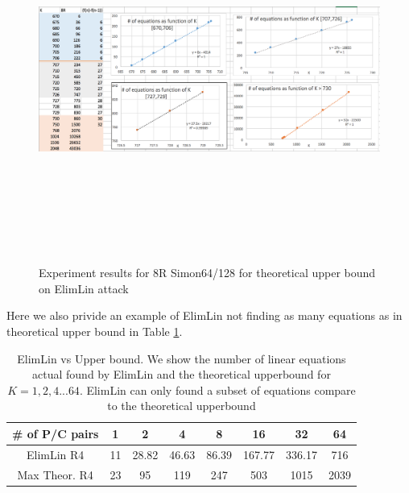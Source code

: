 \begin{figure}[h!]
	\centering
	\begin{minipage}[b][22cm][b]{12cm}
		\begin{turn}{90}
			\includegraphics*[width=220mm, height = 120mm]{./pics/ch6BigScreen.png}
			\end{turn}
			\end{minipage}
			\begin{turn}{90}
				\begin{minipage}[c][1cm][c]{22cm}
					\caption{Experiment results for 8R Simon64/128 for theoretical upper bound on ElimLin attack }
					\label{fig:FullResBig}
					\end{minipage} 
					\end{turn}
					\end{figure}

Here we also privide an example of ElimLin not finding as many equations as in theoretical upper bound in Table \ref{tab:ElimLinVsUpperBound}.
\begin{table}[h!]
	\centering
	\caption[ElimLin vs Upper bound]{ElimLin vs Upper bound. We show the number of linear equations actual found by ElimLin and the theoretical upperbound for $K = 1,2,4 ... 64$. ElimLin can only found a subset of equations compare to the theoretical upperbound}
	\label{tab:ElimLinVsUpperBound}
	\begin{tabular}{|c|c|c|c|c|c|c|c|}
		\hline
		\# of P/C pairs& 1 &	2	& 4 &	8	& 16	& 32	&  64 \\ \hline
		ElimLin R4    & 11 & 28.82 & 46.63 & 86.39 & 167.77 & 336.17 & 716  \\ \hline
		Max Theor. R4 & 23 & 95    & 119   & 247   & 503    & 1015   & 2039 \\ \hline
	\end{tabular}
\end{table}

